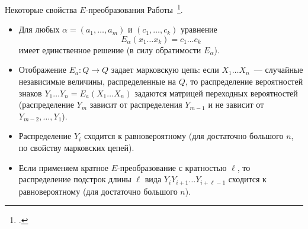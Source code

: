 \begin{frame}{Некоторые свойства $E$-преобразования}
    Работы~\footcite{markovski1999quasigroup, bakeva2011some, markovski2017quasigroup}.
    \begin{itemize}
        \item Для любых $\alpha = (a_1, \ldots, a_m)$ и $(c_1, \ldots, c_k)$ уравнение 
        \[
            E_{\alpha}(x_1 \ldots x_k) = c_1 \ldots c_k
        \]
        имеет единственное решение (в силу обратимости $E_{\alpha}$).
        \pause 
        \item Отображение $E_a \colon Q \to Q$ задает марковскую цепь: если $X_1 \ldots X_n$~--- случайные независимые величины, распределенные на $Q$, то распределение вероятностей знаков $Y_1 \ldots Y_n = E_a(X_1 \ldots X_n)$ задаются матрицей переходных вероятностей (распределение $Y_m$ зависит от распределения $Y_{m-1}$ и не зависит от $Y_{m-2}, \ldots, Y_1$).
        \pause 
        \item Распределение $Y_i$ сходится к равновероятному (для достаточно большого $n$, по свойству марковских цепей).
        \pause 
        \item Если применяем кратное $E$-преобразование с кратностью $\ell$, то распределение подстрок длины $\ell$ вида $Y_i Y_{i+1} \ldots Y_{i + \ell - 1}$ сходится к равновероятному (для достаточно большого $n$).
    \end{itemize}
\end{frame}


